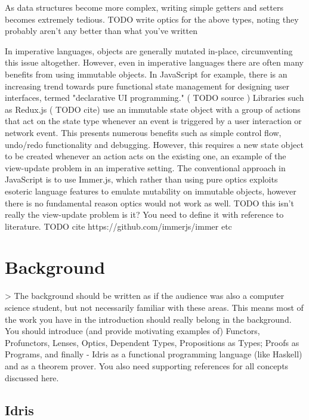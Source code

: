\documentclass[]{report}
\begin{document}
As data structures become more complex, writing simple getters and setters becomes extremely tedious. TODO write optics for the above types, noting they probably aren't any better than what you've written

In imperative languages, objects are generally mutated in-place, circumventing this issue altogether. However, even in imperative languages there are often many benefits from using immutable objects. In JavaScript for example, there is an increasing trend towards pure functional state management for designing user interfaces, termed "declarative UI programming." ( TODO source ) Libraries such as Redux.js ( TODO cite) use an immutable state object with a group of actions that act on the state type whenever an event is triggered by a user interaction or network event. This presents numerous benefits such as simple control flow, undo/redo functionality and debugging. However, this requires a new state object to be created whenever an action acts on the existing one, an example of the view-update problem in an imperative setting. The conventional approach in JavaScript is to use Immer.js, which rather than using pure optics exploits esoteric language features to emulate mutability on immutable objects, however there is no fundamental reason optics would not work as well. TODO this isn't really the view-update problem is it? You need to define it with reference to literature. TODO cite https://github.com/immerjs/immer etc

\fi

\section{Background}

> The background should be written as if the audience was also a computer science student, but not necessarily familiar with these areas. This means most of the work you have in the introduction should really belong in the background. You should introduce (and provide motivating examples of) Functors, Profunctors, Lenses, Optics, Dependent Types, Propositions as Types; Proofs as Programs, and finally -  Idris as a functional programming language (like Haskell) and as a theorem prover. You also need supporting references for all concepts discussed here.


\subsection{Idris}
\end{document}
